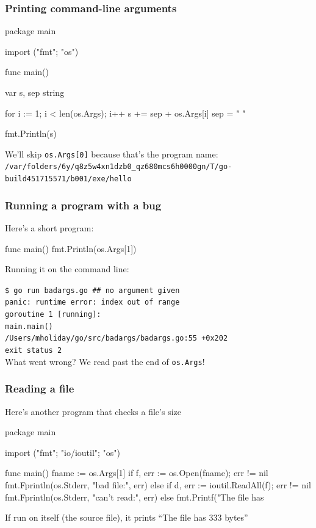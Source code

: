 \documentclass[handout,compress,t,11pt]{beamer}
\begin{document}
\begin{frame}[fragile]
\frametitle{Printing command-line arguments}
\begin{golang}
package main

import ("fmt"; "os")

func main() {
    var s, sep string

    for i := 1; i < len(os.Args); i++ {
        s += sep + os.Args[i]
        sep = " "
    }

    fmt.Println(s)
}
\end{golang}
    \vspace{0.25\baselineskip}
We'll skip \verb|os.Args[0]| because that's the program name:
{\tiny \verb|/var/folders/6y/q8z5w4xn1dzb0_qz680mcs6h0000gn/T/go-build451715571/b001/exe/hello|}
\end{frame}

\begin{frame}[fragile]
    \frametitle{Running a program with a bug}
    Here's a short program:
\begin{golang}
func main() {
    fmt.Println(os.Args[1])
}
\end{golang}
    \vspace{0.5\baselineskip}
    Running it on the command line: \par
    \vspace{0.5\baselineskip}
    {\small\tt \$ go run badargs.go \:\:\: \alert{\#\# no argument given} \\
    panic: runtime error: index out of range \\

    goroutine 1 [running]: \\
    main.main() \\
        /Users/mholiday/go/src/badargs/badargs.go:55 +0x202 \\
    exit status 2 }\\
    \vspace{\baselineskip}
    What went wrong? We read past the end of \verb|os.Args|! \par
\end{frame}

\begin{frame}[fragile]
    \frametitle{Reading a file}
    Here's another program that checks a file's size
\begin{golang}
package main

import ("fmt"; "io/ioutil"; "os")

func main() {
    fname := os.Args[1]
    if f, err := os.Open(fname); err != nil {
        fmt.Fprintln(os.Stderr, "bad file:", err)
    } else if d, err := ioutil.ReadAll(f); err != nil {
        fmt.Fprintln(os.Stderr, "can't read:", err)
    } else {
        fmt.Printf("The file has %
    }
}
\end{golang}
If run on itself (the source file), it prints ``The file has 333 bytes''
\end{frame}
\end{document}
